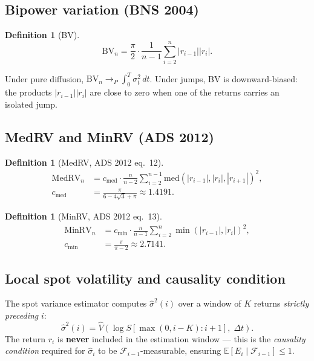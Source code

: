 \documentclass[11pt,a4paper,twocolumn]{article}
\theoremstyle{plain}
\theoremstyle{definition}
\newtheorem{definition}[theorem]{Definition}
\theoremstyle{remark}
\newcommand{\E}{\mathbb{E}}
\newcommand{\dt}{\Delta}
\begin{document}
\subsection{Bipower variation (BNS 2004)}

\begin{definition}[BV]
\begin{equation}\label{eq:bv}
  \mathrm{BV}_n = \frac{\pi}{2} \cdot \frac{1}{n-1}
    \sum_{i=2}^{n} |r_{i-1}||r_i|.
\end{equation}
\end{definition}
Under pure diffusion, $\mathrm{BV}_n \to_P \int_0^T \sigma_t^2\,dt$.
Under jumps, BV is downward-biased: the products $|r_{i-1}||r_i|$ are close
to zero when one of the returns carries an isolated jump.

\subsection{MedRV and MinRV (ADS 2012)}

\begin{definition}[MedRV, ADS 2012 eq.~12]
\begin{align}\label{eq:medrv}
  \mathrm{MedRV}_n &= c_\mathrm{med} \cdot \tfrac{n}{n-2}
    \sum_{i=2}^{n-1} \mathrm{med}(|r_{i-1}|,|r_i|,|r_{i+1}|)^2,\nonumber\\
  c_\mathrm{med} &= \tfrac{\pi}{6-4\sqrt{3}+\pi} \approx 1.4191.
\end{align}
\end{definition}

\begin{definition}[MinRV, ADS 2012 eq.~13]
\begin{align}\label{eq:minrv}
  \mathrm{MinRV}_n &= c_\mathrm{min} \cdot \tfrac{n}{n-1}
    \sum_{i=2}^{n} \min(|r_{i-1}|,|r_i|)^2,\nonumber\\
  c_\mathrm{min} &= \tfrac{\pi}{\pi-2} \approx 2.7141.
\end{align}
\end{definition}

\subsection{Local spot volatility and causality condition}
\label{sec:spot}

The spot variance estimator computes $\hat{\sigma}^2(i)$ over a
window of $K$ returns \emph{strictly preceding} $i$:
\begin{equation}\label{eq:window}
  \hat{\sigma}^2(i) = \hat{V}(\log S[\max(0, i-K) : i+1],\; \dt t).
\end{equation}
The return $r_i$ is \textbf{never} included in the estimation window --- this
is the \emph{causality condition} required for $\hat{\sigma}_i$ to be
$\mathcal{F}_{i-1}$-measurable, ensuring $\E[E_i \mid \mathcal{F}_{i-1}] \le 1$.
\end{document}
